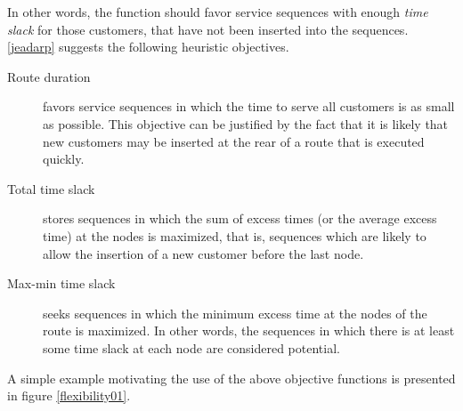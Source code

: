 \documentclass[dissertation,draft*]{aaltoseries}
\begin{document}
In other words, the function should favor service sequences with enough 
\emph{time slack} for those customers, that have not been inserted into the sequences.
\ref{jeadarp} suggests the following heuristic objectives.
% 
\begin{description}
\item[Route duration]
favors service sequences in
which the time to serve all customers is as small as possible. 
This objective can be justified by the fact that 
it is likely that new customers may be inserted at the rear of 
a route that is executed quickly.
\item[Total time slack] 
stores sequences in which
the sum of excess times (or the average excess time) at the nodes is maximized, that
is, sequences which are likely to allow the insertion of a new customer %
before the last node.
\item[Max-min time slack] seeks sequences in which the 
minimum excess time at the nodes of the route is maximized. In other words,
the sequences in which there is at least some time slack at each node
are considered potential.
\end{description}

A simple example motivating the use of the above objective functions is 
presented in figure \ref{flexibility01}.
\end{document}
